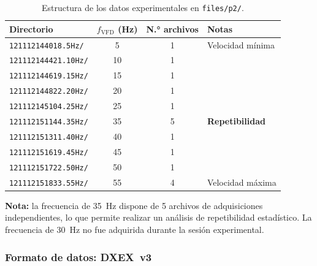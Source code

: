 \documentclass[12pt,a4paper]{article}
\begin{document}
\begin{table}[H]
	\centering
	\caption{Estructura de los datos experimentales en \texttt{files/p2/}.}
	\label{tab:archivos}
	\small
	\begin{tabular}{l c c l}
		\toprule
		\textbf{Directorio}         & \textbf{$f_\mathrm{VFD}$ (Hz)}
		                            & \textbf{N.° archivos}          & \textbf{Notas}                          \\
		\midrule
		\texttt{121112144018.5Hz/}  & 5                              & 1              & Velocidad mínima       \\
		\texttt{121112144421.10Hz/} & 10                             & 1              &                        \\
		\texttt{121112144619.15Hz/} & 15                             & 1              &                        \\
		\texttt{121112144822.20Hz/} & 20                             & 1              &                        \\
		\texttt{121112145104.25Hz/} & 25                             & 1              &                        \\
		\texttt{121112151144.35Hz/} & 35                             & 5              & \textbf{Repetibilidad} \\
		\texttt{121112151311.40Hz/} & 40                             & 1              &                        \\
		\texttt{121112151619.45Hz/} & 45                             & 1              &                        \\
		\texttt{121112151722.50Hz/} & 50                             & 1              &                        \\
		\texttt{121112151833.55Hz/} & 55                             & 4              & Velocidad máxima       \\
		\bottomrule
	\end{tabular}
\end{table}

\textbf{Nota:} la frecuencia de 35~Hz dispone de 5 archivos de adquisiciones
independientes, lo que permite realizar un análisis de repetibilidad
estadístico.  La frecuencia de 30~Hz no fue adquirida durante la sesión
experimental.

\subsubsection{Formato de datos: DXEX~v3}
\end{document}
